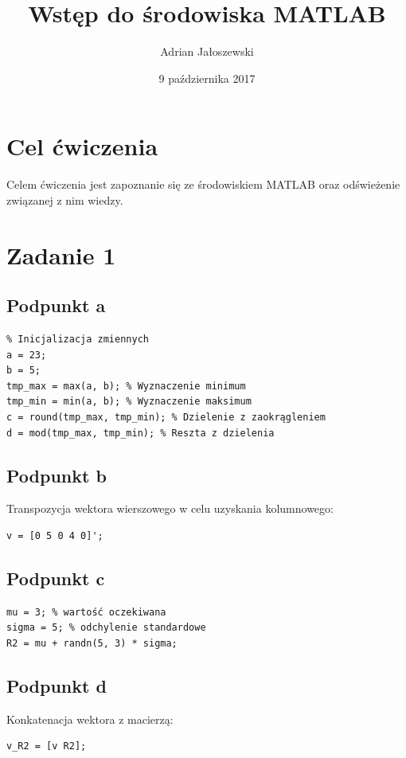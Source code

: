 \documentclass[a4paper, 12pt, titlepage]{article}
\author{Adrian Jałoszewski}
\title{Wstęp do środowiska MATLAB}
\date{9 października 2017}
\begin{document}
    \maketitle
	\section{Cel ćwiczenia}
        Celem ćwiczenia jest zapoznanie się ze środowiskiem MATLAB oraz
        odświeżenie związanej z nim wiedzy.
    \section{Zadanie 1}
        \subsection{Podpunkt a}
\begin{lstlisting}
% Inicjalizacja zmiennych
a = 23;
b = 5;
tmp_max = max(a, b); % Wyznaczenie minimum
tmp_min = min(a, b); % Wyznaczenie maksimum
c = round(tmp_max, tmp_min); % Dzielenie z zaokrągleniem
d = mod(tmp_max, tmp_min); % Reszta z dzielenia
\end{lstlisting}
        \subsection{Podpunkt b}
            Transpozycja wektora wierszowego w celu uzyskania
            kolumnowego:
\begin{lstlisting}
v = [0 5 0 4 0]';
\end{lstlisting}

        \subsection{Podpunkt c}
\begin{lstlisting}
mu = 3; % wartość oczekiwana
sigma = 5; % odchylenie standardowe
R2 = mu + randn(5, 3) * sigma;
\end{lstlisting}

        \subsection{Podpunkt d}
            Konkatenacja wektora z macierzą:
\begin{lstlisting}
v_R2 = [v R2];
\end{lstlisting}
\end{document}
